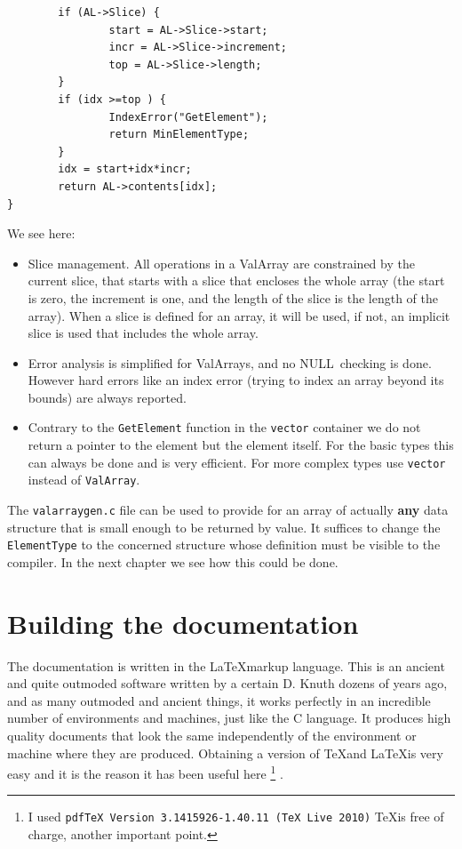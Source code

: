 \documentclass[12pt,a4paper,openany]{memoir} %
\newif\iftth
\newcommand{\Null}{{\iftth \ NULL \else \footnotesize NULL\  \fi}}
\begin{document}
{{\begin{verbatim}
        if (AL->Slice) {
                start = AL->Slice->start;
                incr = AL->Slice->increment;
                top = AL->Slice->length;
        }
        if (idx >=top ) {
                IndexError("GetElement");
                return MinElementType;
        }
        idx = start+idx*incr;
        return AL->contents[idx];
}
\end{verbatim}
We see here:
\begin{itemize}
\item Slice management. All operations in a ValArray are constrained by the current slice, that starts with a slice that encloses the whole array 
(the start is zero, the increment is one, and the length of the slice is the length of the array). When a slice is defined for an array, it will be
used, if not, an implicit slice is used that includes the whole array.
\item Error analysis is simplified for ValArrays, and no \Null checking is done. However hard errors like an index error (trying to index an array beyond
its bounds) are always reported.
\item Contrary to the \verb,GetElement, function in the \verb,vector, container we do not return a pointer to the element but the element
itself. For the basic types this can always be done and is very efficient. For more complex types use \verb,vector, instead of \verb,ValArray,.

\end{itemize}
The \verb,valarraygen.c, file can be used to provide for an array of actually \textbf{any} data structure that is small enough to be returned by value.
It suffices to change the \verb,ElementType, to the concerned structure whose definition must be visible to the compiler. In the next chapter we see how this
could be done.
\section{Building the documentation}
The documentation is written in the \LaTeX markup language. This is an ancient and quite outmoded software written by a certain D. Knuth dozens of
years ago, and as many outmoded and ancient things, it works perfectly in an incredible number of environments and machines, just like the C language.
It produces high quality documents that look the same independently of the environment or machine where they are produced.
Obtaining a version of \TeX and \LaTeX is very easy and it is the reason it has been useful here \footnote{ I used \verb,pdfTeX Version 3.1415926-1.40.11 (TeX Live 2010), \TeX is free of charge, another important point.}
.

}}
\end{document}
